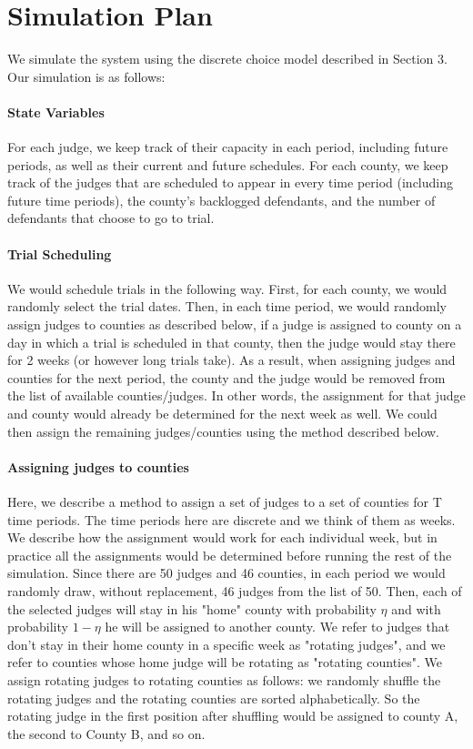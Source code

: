 \documentclass[11pt]{article}
\theoremstyle{ModifiedStyle}
\begin{document}
\section{Simulation Plan}
  We simulate the system using the discrete choice model described in Section 3. Our simulation is as follows:

  \paragraph{State Variables} For each judge, we keep track of their capacity in each period, including future periods, as well as their current and future schedules. For each county, we keep track of the judges that are scheduled to appear in every time period (including future time periods), the county's backlogged defendants, and the number of defendants that choose to go to trial.

  \paragraph{Trial Scheduling} We would schedule trials in the following way. First, for each county, we would randomly select the trial dates. Then, in each time period, we would randomly assign judges to counties as described below, if a judge is assigned to county on a day in which a trial is scheduled in that county, then the judge would stay there for 2 weeks (or however long trials take). As a result, when assigning judges and counties for the next period, the county and the judge would be removed from the list of available counties/judges. In other words, the assignment for that judge and county would already be determined for the next week as well. We could then assign the remaining judges/counties using the method described below.

  \paragraph{Assigning judges to counties} Here, we describe a method to assign a set of judges to a set of counties for T time periods. The time periods here are discrete and we think of them as weeks. We describe how the assignment would work for each individual week, but in practice all the assignments would be determined before running the rest of the simulation. Since there are 50 judges and 46 counties, in each period we would randomly draw, without replacement, 46 judges from the list of 50. Then, each of the selected judges will stay in his "home" county with probability $\eta$ and with probability $1-\eta$ he will be assigned to another county. We refer to judges that don't stay in their home county in a specific week as "rotating judges", and we refer to counties whose home judge will be rotating as "rotating counties". We assign rotating judges to rotating counties as follows: we randomly shuffle the rotating judges and the rotating counties are sorted alphabetically. So the rotating judge in the first position after shuffling would be assigned to county A, the second to County B, and so on.
\end{document}
